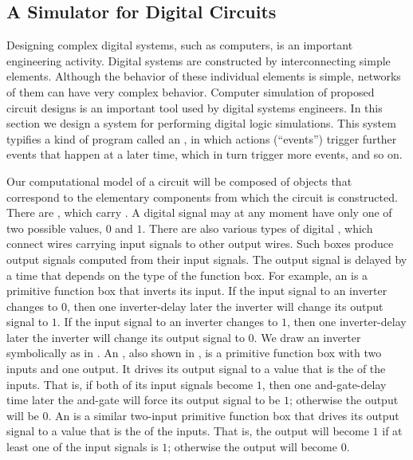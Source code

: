 \subsection{A Simulator for Digital Circuits}
\label{Section 3.3.4}

Designing complex digital systems, such as computers, is an important engineering activity.
Digital systems are constructed by interconnecting simple elements.
Although the behavior of these individual elements is simple, networks of them can have very complex behavior.
Computer simulation of proposed circuit designs is an important tool used by digital systems engineers.
In this section we design a system for performing digital logic simulations.
This system typifies a kind of program called an , in which actions (“events”) trigger further events that happen at a later time, which in turn trigger more events, and so on.

Our computational model of a circuit will be composed of objects that correspond to the elementary components from which the circuit is constructed.
There are , which carry .
A digital signal may at any moment have only one of two possible values, \( 0 \) and \( 1 \).
There are also various types of digital , which connect wires carrying input signals to other output wires.
Such boxes produce output signals computed from their input signals.
The output signal is delayed by a time that depends on the type of the function box.
For example, an  is a primitive function box that inverts its input.
If the input signal to an inverter changes to \( 0 \), then one inverter-delay later the inverter will change its output signal to \( 1 \).
If the input signal to an inverter changes to \( 1 \), then one inverter-delay later the inverter will change its output signal to \( 0 \).
We draw an inverter symbolically as in .
An , also shown in , is a primitive function box with two inputs and one output.
It drives its output signal to a value that is the  of the inputs.
That is, if both of its input signals become \( 1 \), then one and-gate-delay time later the and-gate will force its output signal to be \( 1 \);
otherwise the output will be \( 0 \).
An  is a similar two-input primitive function box that drives its output signal to a value that is the  of the inputs.
That is, the output will become \( 1 \) if at least one of the input signals is \( 1 \);
otherwise the output will become \( 0 \).

